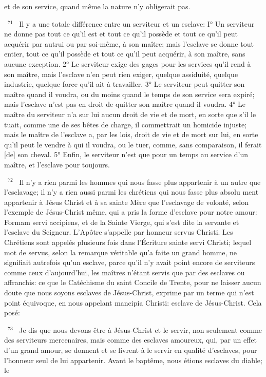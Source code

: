 \documentclass[paper=a5,pagesize=pdftex,fontsize=15pt,headinclude=on,twoside=off]{scrbook}
\newcommand{\negphantom}[1]{\settowidth{\dimen0}{#1}\hspace*{-\dimen0}}
\newcommand{\versenb}[1]{\par \vspace{10pt}~\negphantom{~${}^{#1}$~}${}^{#1}$~}
\begin{document}
et de son service, quand même la nature n'y obligerait pas.
\versenb{71} Il y a une totale différence entre un serviteur et un esclave:
I° Un serviteur ne donne pas tout ce qu'il est et tout ce qu'il possède et tout ce qu'il peut acquérir par autrui ou par
soi-même, à son maître; mais l'esclave se donne tout entier, tout ce qu'il possède et tout ce qu'il peut acquérir, à
son maître, sans aucune exception.
2° Le serviteur exige des gages pour les services qu'il rend à son maître, mais l'esclave n'en peut rien exiger,
quelque assiduité, quelque industrie, quelque force qu'il ait à travailler.
3° Le serviteur peut quitter son maître quand il voudra, ou du moins quand le temps de son service sera expiré;
mais l'esclave n'est pas en droit de quitter son maître quand il voudra.
4° Le maître du serviteur n'a sur lui aucun droit de vie et de mort, en sorte que s'il le tuait, comme une de ses bêtes
de charge, il commettrait un homicide injuste; mais le maître de l'esclave a, par les lois, droit de vie et de mort sur
lui, en sorte qu'il peut le vendre à qui il voudra, ou le tuer, comme, sans comparaison, il ferait [de] son cheval.
5° Enfin, le serviteur n'est que pour un temps au service d'un maître, et l'esclave pour toujours.
\versenb{72} Il n'y a rien parmi les hommes qui nous fasse plus appartenir à un autre que l'esclavage; il n'y a rien aussi
parmi les chrétiens qui nous fasse plus absolu ment appartenir à Jésus Christ et à sa sainte Mère que l'esclavage
de volonté, selon l'exemple de Jésus-Christ même, qui a pris la forme d'esclave pour notre amour: Formam servi
accipiens, et de la Sainte Vierge, qui s'est dite la servante et l'esclave du Seigneur. L'Apôtre s'appelle par honneur
servus Christi. Les Chrétiens sont appelés plusieurs fois dans l'Écriture sainte servi Christi; lequel mot de servus,
selon la remarque véritable qu'a faite un grand homme, ne signifiait autrefois qu'un esclave, parce qu'il n'y avait
point encore de serviteurs comme ceux d'aujourd'hui, les maîtres n'étant servis que par des esclaves ou
affranchis: ce que le Catéchisme du saint Concile de Trente, pour ne laisser aucun doute que nous soyons
esclaves de Jésus-Christ, exprime par un terme qui n'est point équivoque, en nous appelant mancipia Christi:
esclave de Jésus-Christ. Cela posé:
\versenb{73} Je dis que nous devons être à Jésus-Christ et le servir, non seulement comme des serviteurs mercenaires,
mais comme des esclaves amoureux, qui, par un effet d'un grand amour, se donnent et se livrent à le servir en
qualité d'esclaves, pour l'honneur seul de lui appartenir. Avant le baptême, nous étions esclaves du diable; le
\end{document}
